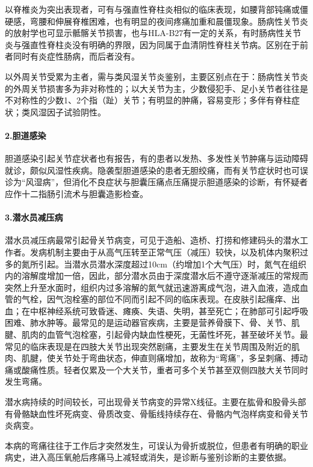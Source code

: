 以脊椎炎为突出表现者，可有与强直性脊柱炎相似的临床表现，如腰背部钝痛或僵硬感，弯腰和伸展脊椎困难，也有明显的夜间疼痛加重和晨僵现象。肠病性关节炎的放射学也可显示骶髂关节损害，也与HLA-B27有一定的关系，有时肠病性关节炎与强直性脊柱炎没有明确的界限，因为同属于血清阴性脊柱关节病。区别在于前者同时有炎症性肠病，而后者没有。

以外周关节受累为主者，需与类风湿关节炎鉴别，主要区别点在于：肠病性关节炎的外周关节损害多为非对称性的；以大关节为主，少数侵犯手、足小关节者往往是不对称性的少数1、2个指（趾）关节；有明显的肿痛，容易变形；多伴有脊柱症状；类风湿因子试验阴性。

\paragraph{2.胆道感染}

胆道感染引起关节症状者也有报告，有的患者以发热、多发性关节肿痛与运动障碍就诊，颇似风湿性疾病。隐袭型胆道感染的患者无胆绞痛，而有关节症状时也可误诊为“风湿病”，但消化不良症状与胆囊压痛点压痛提示胆道感染的诊断，有怀疑者应作十二指肠引流术与胆囊造影检查。

\paragraph{3.潜水员减压病}

潜水员减压病最常引起骨关节病变，可见于造船、造桥、打捞和修建码头的潜水工作者。发病机制主要由于从高气压转至正常气压（减压）较快，以及机体内聚积过多的氮所引起。当潜水员潜水深度超过10cm（约增加1个大气压）时，氮气在组织内的溶解度增加一倍，因此，部分潜水员由于深度潜水后不遵守逐渐减压的常规而突然上升至水面时，组织内过多溶解的氮气就迅速游离成气泡，进入血液，造成血管的气栓，因气泡栓塞的部位不同而引起不同的临床表现。在皮肤引起瘙痒、出血；在中枢神经系统可致昏迷、瘫痪、失语、失明，甚至死亡；在肺部可引起呼吸困难、肺水肿等。最常见的是运动器官疾病，主要是营养骨膜下、骨、关节、肌腱、肌肉的血管气泡栓塞，引起骨内缺血性梗死，无菌性坏死，甚至破坏关节。最常见的临床表现是在四肢大关节出现突然剧痛，主要发生在关节周围及附近的肌肉、肌腱，使关节处于弯曲状态，伸直则痛增加，故称为“弯痛”，多呈刺痛、搏动痛或酸痛性质。轻者仅累及一个大关节，重者可多个关节甚至双侧四肢大关节同时发生弯痛。

潜水病持续的时间较长，可出现骨关节病变的异常X线征。主要在肱骨和股骨头部有骨骼缺血性坏死病变、骨质改变、骨骺线持续存在、骨骼内气泡样病变和骨关节炎病变。

本病的弯痛往往于工作后才突然发生，可误认为骨折或脱位，但患者有明确的职业病史，进入高压氧舱后疼痛马上减轻或消失，是诊断与鉴别诊断的主要依据。

